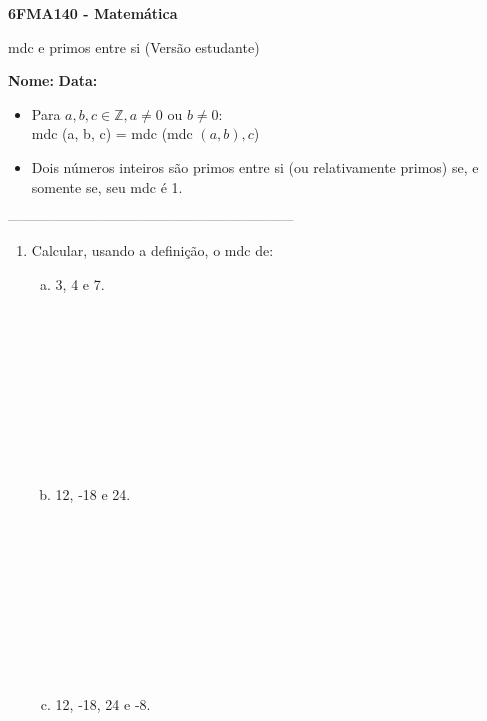 \documentclass[a4paper,14pt]{article}
\begin{document}
	
	\noindent\textbf{6FMA140 - Matemática} 
	
	\begin{center}mdc e primos entre si (Versão estudante)
	\end{center}
	
	\noindent\textbf{Nome:} \underline{\hspace{10cm}}
	\noindent\textbf{Data:} \underline{\hspace{4cm}}
	
	
	\begin{multicols}{2}
	    \noindent
	    \begin{itemize}
	    	\item Para $a, b, c \in \mathbb{Z}, a \neq 0$ ou $b \neq 0$: \\
	    	mdc (a, b, c) = mdc (mdc $(a, b), c$)
	    	\item Dois números inteiros são primos entre si (ou relativamente primos) se, e somente se, seu mdc é 1.
	    \end{itemize}
		\noindent\textsubscript{--------------------------------------------------------------------------}
		\begin{enumerate} 
			\item Calcular, usando a definição, o mdc de:
			\begin{enumerate}[a)]
				\item 3, 4 e 7. \\\\\\\\\\\\\\\\\\\\
				\item 12, -18 e 24. \\\\\\\\\\\\\\\\\\\\
				\item 12, -18, 24 e -8. \\\\\\\\\\\\\\\\\\\\

\end{enumerate}
\end{enumerate}
\end{multicols}
\end{document}
